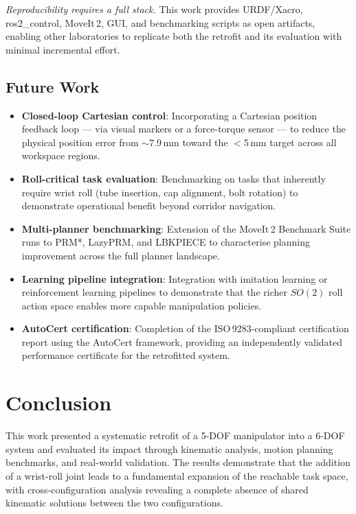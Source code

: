 \documentclass[conference]{IEEEtran}
\begin{document}
	\textit{Reproducibility requires a full stack.}
	This work provides URDF/Xacro, ros2\_control, MoveIt\,2,
	GUI, and benchmarking scripts as open artifacts, enabling
	other laboratories to replicate both the retrofit and
	its evaluation with minimal incremental effort.
	
	\subsection{Future Work}
	
	\begin{itemize}
		\item \textbf{Closed-loop Cartesian control}: Incorporating
		a Cartesian position feedback loop — via visual markers
		or a force-torque sensor — to reduce the physical
		position error from $\sim$7.9\,mm toward the $<$5\,mm
		target across all workspace regions.
		
		\item \textbf{Roll-critical task evaluation}: Benchmarking
		on tasks that inherently require wrist roll (tube
		insertion, cap alignment, bolt rotation) to demonstrate
		operational benefit beyond corridor navigation.
		
		\item \textbf{Multi-planner benchmarking}: Extension of
		the MoveIt\,2 Benchmark Suite runs to PRM*, LazyPRM, and
		LBKPIECE to characterise planning improvement across the
		full planner landscape.
		
		\item \textbf{Learning pipeline integration}: Integration
		with imitation learning or reinforcement learning pipelines
		to demonstrate that the richer $SO(2)$ roll action space
		enables more capable manipulation policies.
		
		\item \textbf{AutoCert certification}: Completion of the
		ISO\,9283-compliant certification report using the AutoCert
		framework, providing an independently validated performance
		certificate for the retrofitted system.
	\end{itemize}

	\section{Conclusion}
	
	This work presented a systematic retrofit of a 5-DOF manipulator into a 6-DOF system and evaluated its impact through kinematic analysis, motion planning benchmarks, and real-world validation. The results demonstrate that the addition of a wrist-roll joint leads to a fundamental expansion of the reachable task space, with cross-configuration analysis revealing a complete absence of shared kinematic solutions between the two configurations.
	
\end{document}
